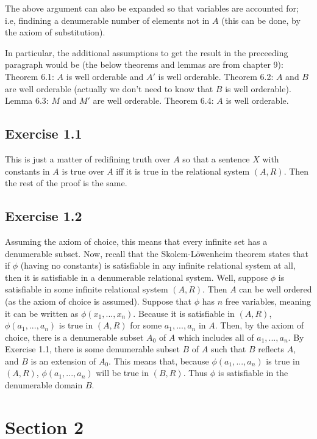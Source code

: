 \documentclass{article}
\theoremstyle{definition}
\begin{document}
The above argument can also be expanded so that variables are accounted for; i.e, findining a denumerable 
number of elements not in $A$ (this can be done, by the axiom of substitution).

In particular, the additional assumptions to get the result in the preceeding paragraph would be
(the below theorems and lemmas are from chapter 9):\newline
Theorem 6.1: $A$ is well orderable and $A'$ is well orderable.\newline
Theorem 6.2: $A$ and $B$ are well orderable (actually we don't need to know that $B$ is well orderable).\newline
Lemma 6.3: $M$ and $M'$ are well orderable.\newline
Theorem 6.4: $A$ is well orderable.

\subsection*{Exercise 1.1}
This is just a matter of redifining truth over $A$ so that a sentence $X$ with constants in $A$ is true over 
$A$ iff it is true in the relational system $(A,R)$. Then the rest of the proof is the same.

\subsection*{Exercise 1.2}
Assuming the axiom of choice, this means that every infinite set has a denumerable subset. Now, recall that the
Skolem-Löwenheim theorem states that if $\phi$ (having no constants) 
is satisfiable in any infinite relational system at all, 
then it is satisfiable in a denumerable relational system. Well, suppose $\phi$ is satisfiable in 
some infinite relational system $(A,R)$. Then $A$ can be well ordered (as the axiom of choice is assumed). Suppose that 
$\phi$ has $n$ free variables, meaning it can be written as $\phi(x_1,...,x_n)$. Because it is satisfiable in 
$(A,R)$, $\phi(a_1,...,a_n)$ is true in $(A,R)$ for some $a_1,...,a_n$ in $A$. Then, by the axiom of choice, there is a 
denumerable subset $A_0$ of $A$ which includes all of $a_1,...,a_n$. By Exercise 1.1, there is some denumerable subset 
$B$ of $A$ such that $B$ reflects $A$, and $B$ is an extension of $A_0$. 
This means that, because $\phi(a_1,...,a_n)$ is true in $(A,R)$, 
$\phi(a_1,...,a_n)$ will be true in $(B,R)$. Thus $\phi$ is satisfiable in the denumerable domain $B$.

\section*{Section 2}
\end{document}

